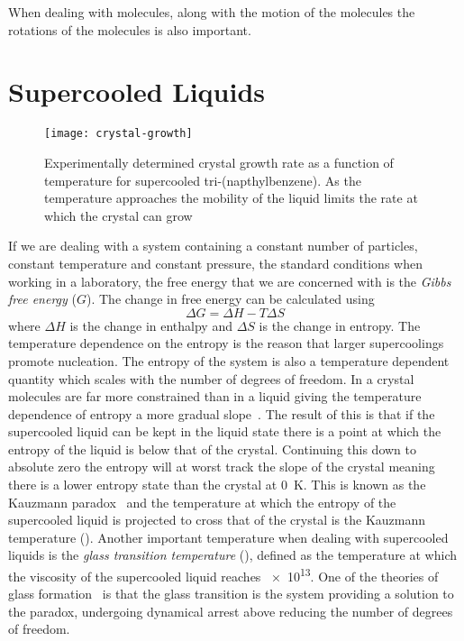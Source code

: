 When dealing with molecules, along with the motion of the molecules the rotations of the molecules is also important. 




\section{Supercooled Liquids}


\begin{figure}
    \centering
    \texttt{[image: crystal-growth]}
    \caption[Crystal growth rate as a function of temperature]{Experimentally determined crystal growth rate as a function of temperature for supercooled tri-(napthylbenzene). As the temperature approaches \si{\Tg} the mobility of the liquid limits the rate at which the crystal can grow}
    \label{fig:crys rate}
\end{figure}

If we are dealing with a system containing a constant number of particles, constant temperature and constant pressure, the standard conditions when working in a laboratory, the free energy that we are concerned with is the \emph{Gibbs free energy} ($G$). The change in free energy can be calculated using
\begin{equation}
    \Delta G = \Delta H - T\Delta S
\end{equation}
where $\Delta H$ is the change in enthalpy and $\Delta S$ is the change in entropy. The temperature dependence on the entropy is the reason that larger supercoolings promote nucleation. The entropy of the system is also a temperature dependent quantity which scales with the number of degrees of freedom. In a crystal molecules are far more constrained than in a liquid giving the temperature dependence of entropy a more gradual slope~. The result of this is that if the supercooled liquid can be kept in the liquid state there is a point at which the entropy of the liquid is below that of the crystal. Continuing this down to absolute zero the entropy will at worst track the slope of the crystal meaning there is a lower entropy state than the crystal at \SI{0}{\kelvin}. This is known as the Kauzmann paradox~\cite{kauzmann:48} and the temperature at which the entropy of the supercooled liquid is projected to cross that of the crystal is the Kauzmann temperature (\si{\Tk}). Another important temperature when dealing with supercooled liquids is the \emph{glass transition temperature} (\si{\Tg}), defined as the temperature at which the viscosity of the supercooled liquid reaches \SI{e13}{\poise}. One of the theories of glass formation~\cite{debenedetti:01} is that the glass transition is the system providing a solution to the paradox, undergoing dynamical arrest above \si{\Tk} reducing the number of degrees of freedom.

